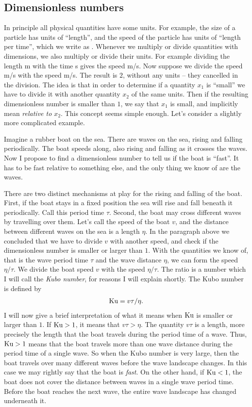 \documentclass[thesis.tex]{subfiles}
\begin{document}
\subsection*{Dimensionless numbers}

In principle all physical quantities have some units. For example, the size of a particle has units of ``length'', and the speed of the particle has units of ``length per time'', which we write as . Whenever we multiply or divide quantities with dimensions, we also multiply or divide their units. For example dividing the length \unit[20]{m} with the time \unit[5]{s} gives the speed \unit[4]{m/s}. Now suppose we divide the speed \unit[4]{m/s} with the speed \unit[2]{m/s}. The result is $2$, without any units -- they cancelled in the division. The idea is that in order to determine if a quantity $x_1$ is ``small'' we have to divide it with another quantity $x_2$ of the same units. Then if the resulting dimensionless number is smaller than $1$, we say that $x_1$ is small, and implicitly mean \emph{relative to $x_2$}.  This concept seems simple enough. Let's consider a slightly more complicated example.

Imagine a rubber boat on the sea. There are waves on the sea, rising and falling periodically.  The boat speeds along, also rising and falling as it crosses the waves. Now I propose to find a dimensionless number to tell us if the boat is ``fast''. It has to be fast relative to something else, and the only thing we know of are the waves. 

There are two distinct mechanisms at play for the rising and falling of the boat. First, if the boat stays in a fixed position the sea will rise and fall beneath it periodically. Call this period time $\tau$. Second, the boat may cross different waves by travelling over them. Let's call the speed of the boat $v$, and the distance between different waves on the sea is a length $\eta$. In the paragraph above we concluded that we have to divide $v$ with another speed, and check if the dimensionless number is smaller or larger than $1$. With the quantities we know of, that is the wave period time $\tau$ and the wave distance $\eta$, we can form the speed $\eta/\tau$. We divide the boat speed $v$ with the speed $\eta/\tau$. The ratio is a number which I will call the \emph{Kubo number}, for reasons I will explain shortly. The Kubo number is defined by
\begin{align*}
\mbox{Ku} = v\tau/\eta.
\end{align*}
I will now give a brief interpretation of what it means when $\mbox{Ku}$ is smaller or larger than $1$. If $\mbox{Ku} > 1$, it means that $v\tau > \eta$. The quantity $v\tau$ is a length, more precisely the length that the boat travels during the period time of a wave. Thus, $\mbox{Ku} > 1$ means that the boat travels more than one wave distance during the period time of a single wave. So when the Kubo number is very large, then the boat travels over many different waves before the wave landscape changes. In this case we may rightly say that the boat is \emph{fast}. On the other hand, if $\mbox{Ku}<1$, the boat does not cover the distance between waves in a single wave period time. Before the boat reaches the next wave, the entire wave landscape has changed underneath it.
\end{document}
